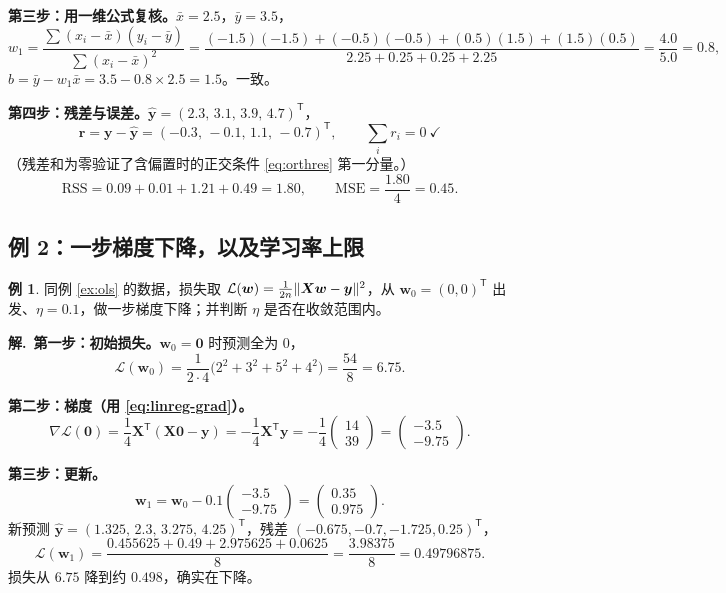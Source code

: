\documentclass[UTF8,a4paper,11pt]{ctexart}
\theoremstyle{definition}
\newtheorem{example}[definition]{例}
\theoremstyle{plain}
\theoremstyle{remark}
\DeclarePairedDelimiter{\norm}{\lVert}{\rVert}
\newcommand{\Loss}{\mathcal{L}}
\newcommand{\T}{^{\mathsf{T}}}
\begin{document}
\textbf{第三步：用一维公式复核。}$\bar x=2.5$，$\bar y=3.5$，
\[
  w_1=\frac{\sum(x_i-\bar x)(y_i-\bar y)}{\sum(x_i-\bar x)^2}
  =\frac{(-1.5)(-1.5)+(-0.5)(-0.5)+(0.5)(1.5)+(1.5)(0.5)}{2.25+0.25+0.25+2.25}
  =\frac{4.0}{5.0}=0.8,
\]
$b=\bar y-w_1\bar x=3.5-0.8\times2.5=1.5$。一致。

\textbf{第四步：残差与误差。}$\hat{\bm{y}}=(2.3,\,3.1,\,3.9,\,4.7)\T$，
\[
  \bm{r}=\bm{y}-\hat{\bm{y}}=(-0.3,\,-0.1,\,1.1,\,-0.7)\T,\qquad
  \sum_ir_i=0\ \checkmark
\]
（残差和为零验证了含偏置时的正交条件 \eqref{eq:orthres} 第一分量。）
\[
  \mathrm{RSS}=0.09+0.01+1.21+0.49=1.80,\qquad
  \mathrm{MSE}=\frac{1.80}{4}=0.45 .
\]

\subsection{例 2：一步梯度下降，以及学习率上限}

\begin{example}\label{ex:gd}
同例 \ref{ex:ols} 的数据，损失取 $\Loss(\bm{w})=\frac{1}{2n}\norm{\bm{X}\bm{w}-\bm{y}}^2$，从 $\bm{w}_0=(0,0)\T$ 出发、$\eta=0.1$，做一步梯度下降；并判断 $\eta$ 是否在收敛范围内。
\end{example}

\noindent\textbf{解.}\ \textbf{第一步：初始损失。}$\bm{w}_0=\bm{0}$ 时预测全为 $0$，
\[
  \Loss(\bm{w}_0)=\frac{1}{2\cdot4}\big(2^2+3^2+5^2+4^2\big)=\frac{54}{8}=6.75 .
\]

\textbf{第二步：梯度（用 \eqref{eq:linreg-grad}）。}
\[
  \nabla\Loss(\bm{0})=\frac14\bm{X}\T(\bm{X}\bm{0}-\bm{y})=-\frac14\bm{X}\T\bm{y}
  =-\frac14\begin{pmatrix}14\\39\end{pmatrix}
  =\begin{pmatrix}-3.5\\-9.75\end{pmatrix}.
\]

\textbf{第三步：更新。}
\[
  \bm{w}_1=\bm{w}_0-0.1\begin{pmatrix}-3.5\\-9.75\end{pmatrix}
  =\begin{pmatrix}0.35\\0.975\end{pmatrix}.
\]
新预测 $\hat{\bm{y}}=(1.325,\,2.3,\,3.275,\,4.25)\T$，残差 $(-0.675,-0.7,-1.725,0.25)\T$，
\[
  \Loss(\bm{w}_1)=\frac{0.455625+0.49+2.975625+0.0625}{8}=\frac{3.98375}{8}=0.49796875 .
\]
损失从 $6.75$ 降到约 $0.498$，确实在下降。
\end{document}
